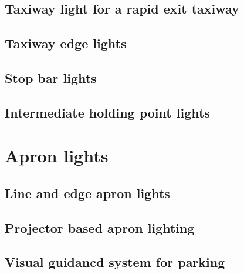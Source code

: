		\subsection{Taxiway light for a rapid exit taxiway}
		\subsection{Taxiway edge lights}
		\subsection{Stop bar lights}
		\subsection{Intermediate holding point lights}
	
	\section{Apron lights}
		\subsection{Line and edge apron lights}
		\subsection{Projector based apron lighting}
		\subsection{Visual guidancd system for parking}
		
		
		

